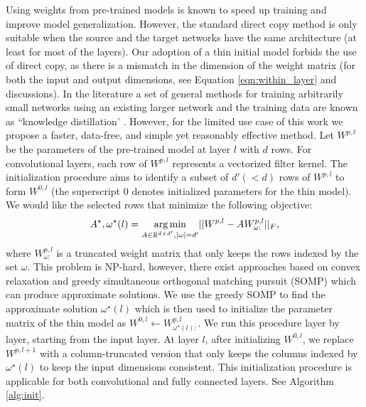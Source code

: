 \documentclass[10pt,twocolumn,letterpaper]{article}
\begin{document}
Using weights from pre-trained models is known to speed up training and improve model generalization. However, the standard direct copy method is only suitable when the source and the target networks have the same architecture (at least for most of the layers). Our adoption of a thin initial model forbids the use of direct copy, as there is a mismatch in the dimension of the weight matrix (for both the input and output dimensions, see Equation \ref{eqn:within_layer} and discussions). In the literature a set of general methods for training arbitrarily small networks using an existing larger network and the training data are known as ``knowledge distillation' \cite{Hinton15,romero2014fitnets}. However, for the limited use case of this work we propose a faster, data-free, and simple yet reasonably effective method. 
Let $W^{p,l}$ be the parameters of the pre-trained model at layer $l$ with $d$ rows. For convolutional layers, each row of $W^{p,l}$ represents a vectorized filter kernel. The initialization procedure aims to identify a subset of $d' (<d)$ rows of $W^{p,l}$ to form $W^{0,l}$ (the superscript $0$ denotes initialized parameters for the thin model). %
We would like the selected rows that minimize the following objective:
\begin{equation}
\label{eqn:somp}
A^\star, \omega^{\star}(l) = \underset{A \in \mathbb{R}^{d \times d'}, |\omega|=d'}{\arg\min} ||W^{p,l} - AW^{p,l}_{\omega:}||_F,
\vspace{-1mm}
\end{equation}
\noindent where $W^{p,l}_{\omega:}$ is a truncated weight matrix that only keeps the rows indexed by the set $\omega$. This problem is NP-hard, however, there exist approaches based on convex relaxation \cite{tropp2006algorithms} and greedy simultaneous orthogonal matching pursuit (SOMP) \cite{somp} which can produce approximate solutions. 
We use the greedy SOMP to find the approximate solution $\omega^{\star}(l)$ 
which is then used to initialize the parameter matrix of the thin model as $W^{0,l}\leftarrow W^{p,l}_{\omega^{\star}(l):}$.
We run this procedure layer by layer, starting from the input layer. At layer $l$, after initializing $W^{0,l}$, we replace $W^{p,l+1}$ with a column-truncated version that only keeps the columns indexed by $\omega^{\star}(l)$ to keep the input dimensions consistent. This initialization procedure is applicable for both convolutional and fully connected layers. See Algorithm \ref{alg:init}. 
\end{document}
